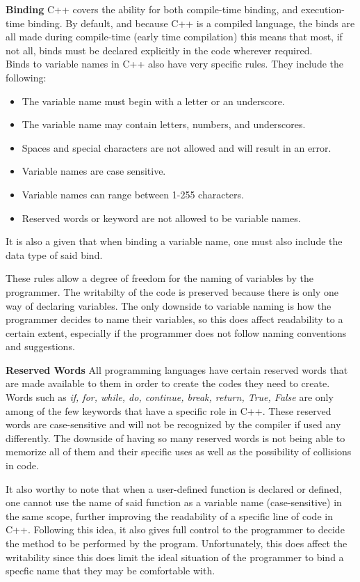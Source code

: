 \documentclass[12pt]{article}
\begin{document}
\textbf{Binding} C++ covers the ability for both compile-time binding, and execution-time binding. By default, and because C++ is a compiled language, the binds are all made during compile-time (early time compilation) this means that most, if not all, binds must be declared explicitly in the code wherever required.\\ Binds to variable names in C++ also have very specific rules. They include the following:
\begin{itemize}
  \item The variable name must begin with a letter or an underscore.
  \item The variable name may contain letters, numbers, and underscores.
  \item Spaces and special characters are not allowed and will result in an error.
  \item Variable names are case sensitive.
  \item Variable names can range between 1-255 characters.
  \item Reserved words or keyword are not allowed to be variable names.
\end{itemize}
It is also a given that when binding a variable name, one must also include the data type of said bind.

These rules allow a degree of freedom for the naming of variables by the programmer. The writabilty of the code is preserved because there is only one way of declaring variables. The only downside to variable naming is how the programmer decides to name their variables, so this does affect readability to a certain extent, especially if the programmer does not follow naming conventions and suggestions.  

\textbf{Reserved Words} All programming languages have certain reserved words that are made available to them in order to create the codes they need to create. Words such as \textit{if, for, while, do, continue, break, return, True, False} are only among of the few keywords that have a specific role in C++. These reserved words are case-sensitive and will not be recognized by the compiler if used any differently. The downside of having so many reserved words is not being able to memorize all of them and their specific uses as well as the possibility of collisions in code. 

It also worthy to note that when a user-defined function is declared or defined, one cannot use the name of said function as a variable name (case-sensitive) in the same scope, further improving the readability of a specific line of code in C++. Following this idea, it also gives full control to the programmer to decide the method to be performed by the program. Unfortunately, this does affect the writability since this does limit the ideal situation of the programmer to bind a specfic name that they may be comfortable with. 
\end{document}
